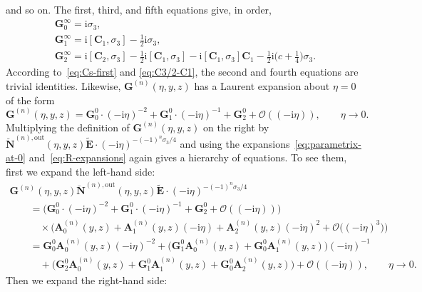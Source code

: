 and so on. The first, third, and fifth equations give, in order,
\begin{gather*}
\mathbf{G}_0^\infty=\mathrm{i}\sigma_3,\\
\mathbf{G}_1^\infty=\mathrm{i}[\mathbf{C}_1,\sigma_3]-\tfrac{1}{2}\mathrm{i}\sigma_3,\\
\mathbf{G}_2^\infty=\mathrm{i}[\mathbf{C}_2,\sigma_3]-\tfrac{1}{2}\mathrm{i}[\mathbf{C}_1,\sigma_3]-\mathrm{i}[\mathbf{C}_1,\sigma_3]\mathbf{C}_1-\tfrac{1}{2}\mathrm{i}\bigl(c+\tfrac{1}{4}\bigr)\sigma_3.
\end{gather*}
According to~\eqref{eq:Cs-first} and \eqref{eq:C3/2-C1}, the second and fourth equations are trivial identities. Likewise, $\mathbf{G}^{(n)}(\eta,y,z)$ has a Laurent expansion about $\eta=0$ of the form
\begin{equation*}
\mathbf{G}^{(n)}(\eta,y,z)=\mathbf{G}^0_0\cdot (-\mathrm{i}\eta)^{-2} +\mathbf{G}^0_1\cdot (-\mathrm{i}\eta)^{-1} + \mathbf{G}^0_2 + \mathcal{O}((-\mathrm{i}\eta)),\qquad\eta\to 0.
\end{equation*}
Multiplying the definition of $\mathbf{G}^{(n)}(\eta,y,z)$ on the right by $\breve{\mathbf{N}}^{(n),\mathrm{out}}(\eta,y,z)\widetilde{\mathbf{E}}\cdot(-\mathrm{i}\eta)^{-(-1)^n\sigma_3/4}$ and using the expansions~\eqref{eq:parametrix-at-0} and~\eqref{eq:R-expansions} again gives a hierarchy of equations. To see them, first we expand the left-hand side:
\begin{gather*}
\mathbf{G}^{(n)}(\eta,y,z)\breve{\mathbf{N}}^{(n),\mathrm{out}}(\eta,y,z)\widetilde{\mathbf{E}}\cdot(-\mathrm{i}\eta)^{-(-1)^n\sigma_3/4}\\
\qquad{}=\bigl(\mathbf{G}^0_0\cdot (-\mathrm{i}\eta)^{-2} +\mathbf{G}^0_1\cdot (-\mathrm{i}\eta)^{-1} + \mathbf{G}^0_2 + \mathcal{O}((-\mathrm{i}\eta))\bigr)\\
\qquad\quad{}\times\bigl(\mathbf{A}_0^{(n)}(y,z) + \mathbf{A}_1^{(n)}(y,z)(-\mathrm{i}\eta) + \mathbf{A}_2^{(n)}(y,z)(-\mathrm{i}\eta)^2 + \mathcal{O}\bigl((-\mathrm{i}\eta)^3\bigr)\bigr)\\
\qquad{}=\mathbf{G}_0^0\mathbf{A}_0^{(n)}(y,z)(-\mathrm{i}\eta)^{-2} + \bigl(\mathbf{G}_1^0\mathbf{A}_0^{(n)}(y,z) + \mathbf{G}_0^0\mathbf{A}_1^{(n)}(y,z)\bigr)(-\mathrm{i}\eta)^{-1} \\
\qquad\quad{}+
\bigl(\mathbf{G}_2^0\mathbf{A}_0^{(n)}(y,z) + \mathbf{G}_1^0\mathbf{A}_1^{(n)}(y,z) + \mathbf{G}_0^0\mathbf{A}_2^{(n)}(y,z)\bigr) + \mathcal{O}((-\mathrm{i}\eta)),\qquad\eta\to 0.
\end{gather*}
Then we expand the right-hand side:
